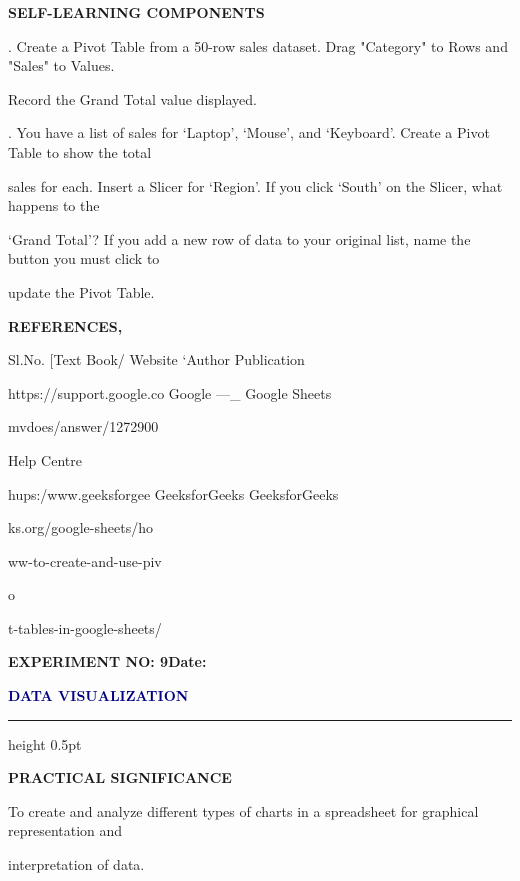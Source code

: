 \documentclass[10pt,a4paper]{article}
\newcommand{\expheading}[2]{%
  \vspace{0.1cm}\noindent\textbf{\large EXPERIMENT NO: #1}\hfill\textbf{Date: #2}\par
}
\newcommand{\exptitle}[1]{%
  \begin{center}\vspace{-2mm}\textcolor{navy}{\fontsize{20}{22}\selectfont\bfseries #1}\end{center}
  \vspace{1mm}\hrule height 0.5pt\vspace{3mm}
}
\begin{document}
\medskip\noindent\textbf{SELF-LEARNING COMPONENTS}\par
{}. Create a Pivot Table from a 50-row sales dataset. Drag "Category" to Rows and "Sales" to Values.\par
\noindent Record the Grand Total value displayed.\par
{}. You have a list of sales for ‘Laptop’, ‘Mouse’, and ‘Keyboard’. Create a Pivot Table to show the total\par
\noindent sales for each. Insert a Slicer for ‘Region’. If you click ‘South’ on the Slicer, what happens to the\par
\noindent ‘Grand Total’? If you add a new row of data to your original list, name the button you must click to\par
\noindent update the Pivot Table.\par
\medskip\noindent\textbf{REFERENCES,}\par
\noindent Sl.No. [Text Book/ Website ‘Author Publication\par

                           https://support.google.co   Google —\_        Google Sheets\par
\noindent mvdoes/answer/1272900\par
\noindent Help Centre\par

                           hups:/www.geeksforgee       GeeksforGeeks    GeeksforGeeks\par
\noindent ks.org/google-sheets/ho\par
\noindent ww-to-create-and-use-piv\par
\noindent o\par
\noindent t-tables-in-google-sheets/\par
\clearpage
\expheading{9}{\underline{\hspace{1.8cm}}}
\exptitle{DATA VISUALIZATION}
\medskip\noindent\textbf{PRACTICAL SIGNIFICANCE}\par
\noindent To create and analyze different types of charts in a spreadsheet for graphical representation and\par
\noindent interpretation of data.\par
\end{document}
